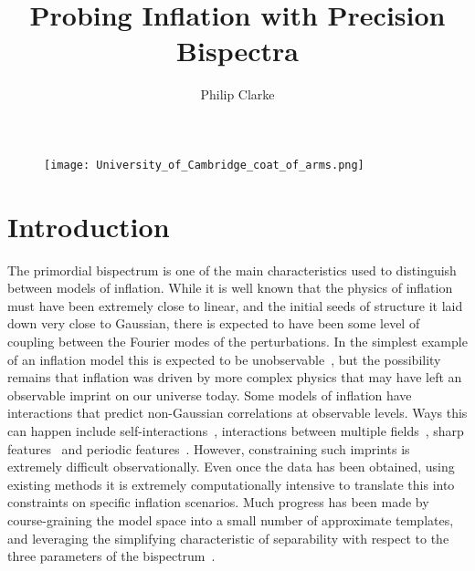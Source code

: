 \documentclass[a4paper,12pt]{extarticle}
\title{Probing Inflation with Precision Bispectra}
\author{
    Philip Clarke
}
\affiliation{Centre for Theoretical Cosmology, DAMTP, University of Cambridge, Cambridge CB3 0WA, United Kingdom}
\begin{document}
\maketitle
\begin{figure}[!pth]
\centering
\texttt{[image: University\_of\_Cambridge\_coat\_of\_arms.png]}
\end{figure}

\flushbottom
\newpage

\section{Introduction}\label{sec:intro}
The primordial bispectrum is one of the main
characteristics used to distinguish between models of inflation. While it is well
known that the physics of inflation must have been extremely close
to linear, and the initial seeds of structure it laid down
very close to Gaussian, there is expected to have been some level of coupling
between the Fourier modes of the perturbations.
In the simplest example of an inflation model this is
expected to be unobservable~\cite{Maldacena},
but the possibility remains that inflation was driven by
more complex physics that may have left an observable imprint on our universe today.
Some models of inflation have interactions that predict non-Gaussian
correlations at observable levels. Ways this can happen include
self-interactions~\cite{px_burrage,dbi_in_the_sky},
interactions between multiple fields~\cite{Byrnes_2010},
sharp features~\cite{adshead}
and periodic features~\cite{flauger_pajer_resonant}.
However, constraining such imprints is extremely difficult observationally.
Even once the data has been obtained, using existing methods it is
extremely computationally intensive to translate this into constraints
on specific inflation scenarios. Much progress has been made by course-graining
the model space into a small number of approximate templates,
and leveraging the simplifying characteristic of separability
with respect to the three parameters of the bispectrum~\cite{Komatsu_2005, Munchmeyer_2014}.
\end{document}
